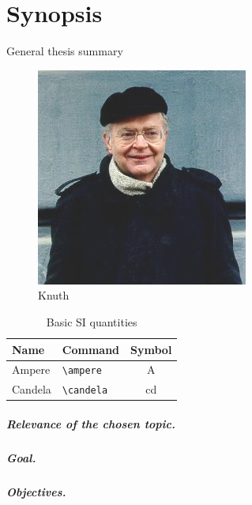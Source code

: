 \renewcommand{\thesubfigure}{\alph{subfigure}}
\renewcommand{\figurename}{Figure}
\renewcommand{\tablename}{Table}
\setcounter{figure}{0}
\setcounter{table}{0}

\chapter*{Synopsis}

\begin{center}
    General thesis summary
\end{center}
\begin{figure}
	\centering
	\includegraphics[width=0.4\linewidth]{images/knuth}
	\caption{Knuth}
\end{figure}
\begin{table}
	\centering
	\captionsetup{justification=centering} %
	\caption{Basic SI quantities}%
	\begin{tabular}{llc}
		\toprule
		Name 	& 	Command 	& 	Symbol         \\
		\midrule
		Ampere     & \verb|\ampere| & \si{\ampere}   \\
		Candela   & \verb|\candela| & \si{\candela}  \\
		\bottomrule
	\end{tabular}
\end{table}

\paragraph*{Relevance of the chosen topic.}
\paragraph*{Goal.}
\paragraph*{Objectives.}
